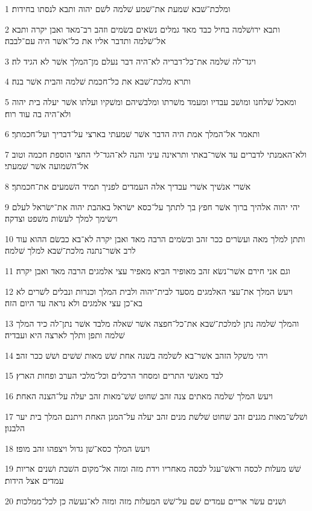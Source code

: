 \par 1 ומלכת־שׁבא שׁמעת את־שׁמע שׁלמה לשׁם יהוה ותבא לנסתו בחידות׃
\par 2 ותבא ירושׁלמה בחיל כבד מאד גמלים נשׂאים בשׂמים וזהב רב־מאד ואבן יקרה ותבא אל־שׁלמה ותדבר אליו את כל־אשׁר היה עם־לבבה׃
\par 3 ויגד־לה שׁלמה את־כל־דבריה לא־היה דבר נעלם מן־המלך אשׁר לא הגיד לה׃
\par 4 ותרא מלכת־שׁבא את כל־חכמת שׁלמה והבית אשׁר בנה׃
\par 5 ומאכל שׁלחנו ומושׁב עבדיו ומעמד משׁרתו ומלבשׁיהם ומשׁקיו ועלתו אשׁר יעלה בית יהוה ולא־היה בה עוד רוח׃
\par 6 ותאמר אל־המלך אמת היה הדבר אשׁר שׁמעתי בארצי על־דבריך ועל־חכמתך׃
\par 7 ולא־האמנתי לדברים עד אשׁר־באתי ותראינה עיני והנה לא־הגד־לי החצי הוספת חכמה וטוב אל־השׁמועה אשׁר שׁמעתי׃
\par 8 אשׁרי אנשׁיך אשׁרי עבדיך אלה העמדים לפניך תמיד השׁמעים את־חכמתך׃
\par 9 יהי יהוה אלהיך ברוך אשׁר חפץ בך לתתך על־כסא ישׂראל באהבת יהוה את־ישׂראל לעלם וישׂימך למלך לעשׂות משׁפט וצדקה׃
\par 10 ותתן למלך מאה ועשׂרים ככר זהב ובשׂמים הרבה מאד ואבן יקרה לא־בא כבשׂם ההוא עוד לרב אשׁר־נתנה מלכת־שׁבא למלך שׁלמה׃
\par 11 וגם אני חירם אשׁר־נשׂא זהב מאופיר הביא מאפיר עצי אלמגים הרבה מאד ואבן יקרה׃
\par 12 ויעשׂ המלך את־עצי האלמגים מסעד לבית־יהוה ולבית המלך וכנרות ונבלים לשׁרים לא בא־כן עצי אלמגים ולא נראה עד היום הזה׃
\par 13 והמלך שׁלמה נתן למלכת־שׁבא את־כל־חפצה אשׁר שׁאלה מלבד אשׁר נתן־לה כיד המלך שׁלמה ותפן ותלך לארצה היא ועבדיה׃
\par 14 ויהי משׁקל הזהב אשׁר־בא לשׁלמה בשׁנה אחת שׁשׁ מאות שׁשׁים ושׁשׁ ככר זהב׃
\par 15 לבד מאנשׁי התרים ומסחר הרכלים וכל־מלכי הערב ופחות הארץ׃
\par 16 ויעשׂ המלך שׁלמה מאתים צנה זהב שׁחוט שׁשׁ־מאות זהב יעלה על־הצנה האחת׃
\par 17 ושׁלשׁ־מאות מגנים זהב שׁחוט שׁלשׁת מנים זהב יעלה על־המגן האחת ויתנם המלך בית יער הלבנון׃
\par 18 ויעשׂ המלך כסא־שׁן גדול ויצפהו זהב מופז׃
\par 19 שׁשׁ מעלות לכסה וראשׁ־עגל לכסה מאחריו וידת מזה ומזה אל־מקום השׁבת ושׁנים אריות עמדים אצל הידות׃
\par 20 ושׁנים עשׂר אריים עמדים שׁם על־שׁשׁ המעלות מזה ומזה לא־נעשׂה כן לכל־ממלכות׃
